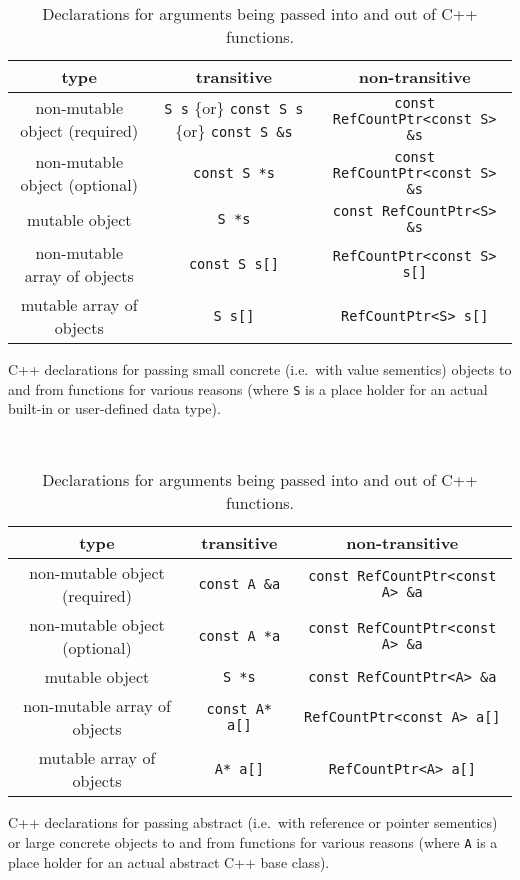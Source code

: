 \begin{table}
%
\begin{minipage}{\textwidth}
\begin{tabular}{|c|c|c|}
\hline
type
& transitive
& non-transitive \\
\hline
non-mutable object (required)
& \texttt{S s} \{or\} \texttt{const S s} \{or\} \texttt{const S \&s}
& \texttt{const RefCountPtr<const S> \&s} \\
\hline
non-mutable object (optional)
& \texttt{const S *s}
& \texttt{const RefCountPtr<const S> \&s} \\
\hline
mutable object
& \texttt{S *s}
& \texttt{const RefCountPtr<S> \&s} \\
\hline
non-mutable array of objects
& \texttt{const S s[]}
& \texttt{RefCountPtr<const S> s[]} \\
\hline
mutable array of objects
& \texttt{S s[]}
& \texttt{RefCountPtr<S> s[]} \\
\hline
\end{tabular}
\begin{center}
C++ declarations for passing small concrete (i.e.~with value
sementics) objects to and from functions for various reasons (where
\texttt{S} is a place holder for an actual built-in or user-defined
data type).
\end{center}
\end{minipage}
%
\\[5ex]
%
\begin{minipage}{\textwidth}
\begin{tabular}{|c|c|c|}
\hline
type
& transitive
& non-transitive \\
\hline
non-mutable object (required)
& \texttt{const A \&a}
& \texttt{const RefCountPtr<const A> \&a} \\
\hline
non-mutable object (optional)
& \texttt{const A *a}
& \texttt{const RefCountPtr<const A> \&a} \\
\hline
mutable object
& \texttt{S *s}
& \texttt{const RefCountPtr<A> \&a} \\
\hline
non-mutable array of objects
& \texttt{const A* a[]}
& \texttt{RefCountPtr<const A> a[]} \\
\hline
mutable array of objects
& \texttt{A* a[]}
& \texttt{RefCountPtr<A> a[]} \\
\hline
\end{tabular}
\begin{center}
C++ declarations for passing abstract (i.e.~with reference or pointer
sementics) or large concrete objects to and from functions for various
reasons (where \texttt{A} is a place holder for an actual abstract C++
base class).
\end{center}
\end{minipage}
%
\caption{Declarations for arguments being passed into and out of C++ functions.}
%
\end{table}


